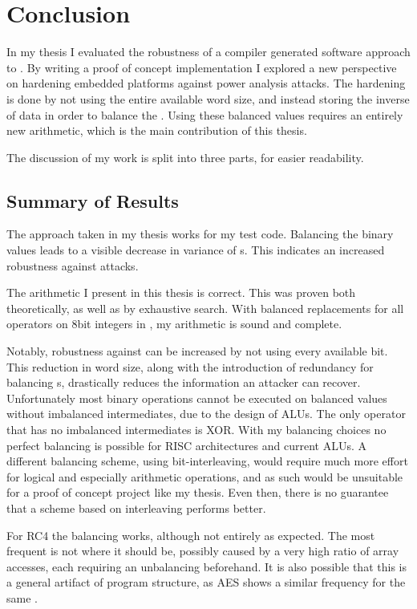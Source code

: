 \chapter{Conclusion}
\label{conclusion}
In my thesis I evaluated the robustness of a compiler generated software approach to \dual{}.
By writing a proof of concept implementation I explored a new perspective on hardening embedded platforms against power analysis attacks.
The hardening is done by not using the entire available word size, and instead storing the inverse of data in order to balance the \hammingw{}.
Using these balanced values requires an entirely new arithmetic, which is the main contribution of this thesis.

The discussion of my work is split into three parts, for easier readability.

\section{Summary of Results}
The approach taken in my thesis works for my test code.
Balancing the binary values leads to a visible decrease in variance of \hammingw{}s.
This indicates an increased robustness against \poweranalysis{} attacks.

The arithmetic I present in this thesis is correct.
This was proven both theoretically, as well as by exhaustive search.
With balanced replacements for all operators on 8bit integers in \ir{}, my arithmetic is sound and complete.

Notably, robustness against \poweranalysis{} can be increased by not using every available bit.
This reduction in word size, along with the introduction of redundancy for balancing \hammingw{}s, drastically reduces the information an attacker can recover.
Unfortunately most binary operations cannot be executed on balanced values without imbalanced intermediates, due to the design of ALUs.
The only operator that has no imbalanced intermediates is XOR.
With my balancing choices no perfect balancing is possible for RISC architectures and current ALUs.
A different balancing scheme, using bit-interleaving, would require much more effort for logical and especially arithmetic operations, and as such would be unsuitable for a proof of concept project like my thesis.
Even then, there is no guarantee that a scheme based on interleaving performs better.

For RC4 the balancing works, although not entirely as expected.
The most frequent \hammingw{} is not where it should be, possibly caused by a very high ratio of array accesses, each requiring an unbalancing beforehand.
It is also possible that this is a general artifact of program structure, as AES shows a similar frequency for the same \hammingw{}.

